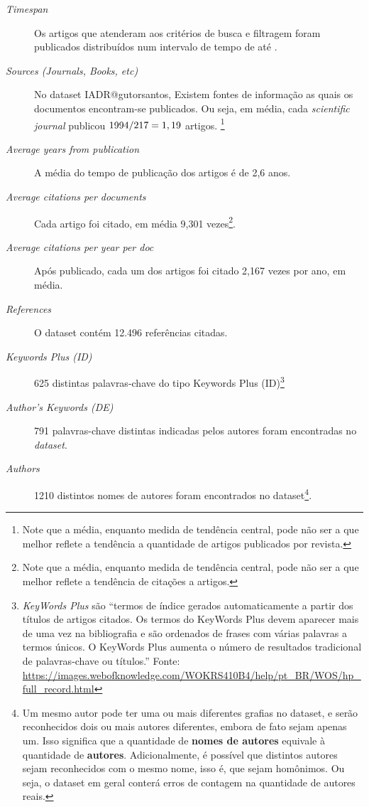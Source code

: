 \begin{description}
    \item [\textit{Timespan}] Os artigos que atenderam aos critérios de busca e filtragem foram publicados distribuídos num intervalo de tempo de \startYearIADR{} até \finalYearIADR{}.
    \item [\textit{Sources (Journals, Books, etc)}] No dataset IADR@gutorsantos, Existem \totalSource{} fontes de informação as quais os documentos encontram-se publicados. Ou seja, em média, cada \textit{scientific journal} publicou $1994{}/217{}=1,19$ artigos. \footnote{Note que a média, enquanto medida de tendência central, pode não ser a que melhor reflete a tendência a quantidade de artigos publicados por revista.}
    \item [\textit{Average years from publication}] A média do tempo de publicação dos artigos é de 2,6 anos.
    \item [\textit{Average citations per documents}] Cada artigo foi citado, em média 9,301 vezes\footnote{Note que a média, enquanto medida de tendência central, pode não ser a que melhor reflete a tendência de  citações a artigos.}.
    \item [\textit{Average citations per year per doc}] Após publicado, cada um dos \totalDocuments{} artigos foi citado 2,167 vezes por ano, em média.
    \item [\textit{References}] O dataset contém 12.496 referências citadas.
    \item [\textit{Keywords Plus (ID)}] 625 distintas palavras-chave do tipo Keywords Plus (ID)\footnote{\textit{KeyWords Plus} são ``termos de índice gerados automaticamente a partir dos títulos de artigos citados. Os termos do KeyWords Plus devem aparecer mais de uma vez na bibliografia e são ordenados de frases com várias palavras a termos únicos. O KeyWords Plus aumenta o número de resultados tradicional de palavras-chave ou títulos.'' Fonte: \url{https://images.webofknowledge.com/WOKRS410B4/help/pt_BR/WOS/hp_full_record.html}}
    \item [\textit{Author's Keywords (DE)}] 791 palavras-chave distintas indicadas pelos autores foram encontradas no \textit{dataset}.
    \item [\textit{Authors}] 1210 distintos nomes de autores foram encontrados no dataset\footnote{Um mesmo autor pode ter uma ou mais diferentes grafias no dataset, e serão reconhecidos dois ou mais autores diferentes, embora de fato sejam apenas um. Isso significa que a quantidade de \textbf{nomes de autores} equivale à quantidade de \textbf{autores}. Adicionalmente, é possível que distintos autores sejam reconhecidos com o mesmo nome, isso é, que sejam homônimos. Ou seja, o dataset em geral conterá erros de contagem na quantidade de autores reais.}.

\end{description}
